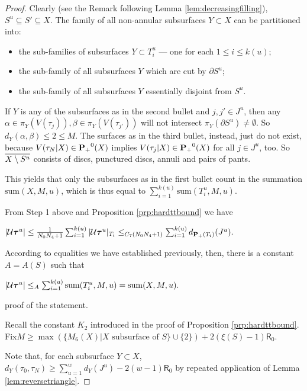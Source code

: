 \begin{proof}
Clearly (see the Remark following Lemma \ref{lem:decreasingfilling}), $S^u\subseteq S'\subseteq X$. The family of all non-annular subsurfaces $Y\subset X$ can be partitioned into:
\begin{itemize}
\item the sub-families of subsurfaces $Y\subset T_i^u$ --- one for each $1\leq i\leq k(u)$;
\item the sub-family of all subsurfaces $Y$ which are cut by $\partial S^u$;
\item the sub-family of all subsurfaces $Y$ essentially disjoint from $S^u$.
\end{itemize}
If $Y$ is any of the subsurfaces as in the second bullet and $j,j'\in J^u$, then any $\alpha\in \pi_Y(V(\tau_j)), \beta\in \pi_Y(V(\tau_{j'}))$  will not intersect $\pi_Y(\partial S^u)\not=\emptyset$. So $d_Y(\alpha,\beta)\leq 2\leq M$. The surfaces as in the third bullet, instead, just do not exist, because $V(\tau_N|X)\in {\mathbf{P}_+}^0(X)$ implies $V(\tau_j|X)\in {\mathbf{P}_+}^0(X)$ for all $j\in J^u$, too. So $\overline{X\setminus S^u}$ consists of discs, punctured discs, annuli and pairs of pants.

This yields that only the subsurfaces as in the first bullet count in the summation $\mathrm{sum}(X,M,u)$, which is thus equal to $\sum_{i=1}^{k(u)} \mathrm{sum}(T_i^u,M,u)$.

From Step 1 above and Proposition \ref{prp:hardttbound} we have

\begin{center}
$|{\mathcal U}\bm\tau^u| \leq \frac{1}{N_0 N_4+1} \sum_{i=1}^{k(u)} |{\mathcal U}\bm\tau^u|_{T_i} \leq_{C_7(N_0 N_4+1)} \sum_{i=1}^{k(u)} d_{{\mathbf{P}_+}(T_i)}(J^u).$
\end{center}

According to equalities we have established previously, then, there is a constant $A=A(S)$ such that

\begin{center}
$|{\mathcal U}\bm\tau^u|\leq_A \sum_{i=1}^{k(u)}\mathrm{sum}(T_i^u,M,u) = \mathrm{sum}(X,M,u).$
\end{center}

 proof of the statement.

Recall the constant $K_2$ introduced in the proof of Proposition \ref{prp:hardttbound}. Fix\linebreak $M\geq \max\left( \{M_6(X)|X\text{ subsurface of }S\}\cup\{2\}\right) + 2(\xi(S)-1)\mathsf{R}_0$.

Note that, for each subsurface $Y\subset X$, $d_Y(\tau_0,\tau_N)\geq \sum_{u=1}^w d_Y(J^u)-2(w-1)\mathsf{R}_0$ by repeated application of Lemma \ref{lem:reversetriangle}.


\end{proof}
